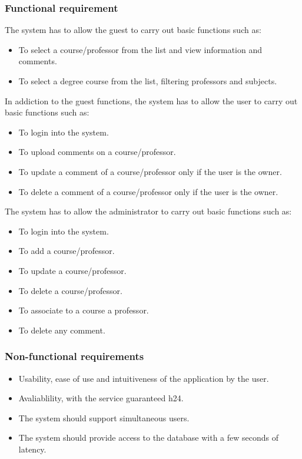 \documentclass[a4paper, oneside]{article}
\begin{document}
\subsubsection{Functional requirement}
The system has to allow the guest to carry out basic functions such as:
\begin{itemize}
\item To select a course/professor from the list and view information and comments.
\item To select a degree course from the list, filtering professors and subjects.
\end{itemize}
In addiction to the guest functions, the system has to allow the user to carry out basic functions such as:
\begin{itemize}
\item To login into the system.
\item To upload comments on a course/professor.
\item To update a comment of a course/professor only if the user is the owner.
\item To delete a comment of a course/professor only if the user is the owner.
\end{itemize}
\vspace{2mm}
The system has to allow the administrator to carry out basic functions such as:
\begin{itemize}
\item To login into the system.
\item To add a course/professor.
\item To update a course/professor.
\item To delete a course/professor.
\item To associate to a course a professor.
\item To delete any comment.
\end{itemize}
\vspace{2mm}

\subsubsection{Non-functional requirements}
\begin{itemize}
\item Usability, ease of use and intuitiveness of the application by the user.
\item Avaliablility, with the service guaranteed h24.
\item The system should support simultaneous users.
\item The system should provide access to the database with a few seconds of latency.
\end{itemize}
\end{document}
